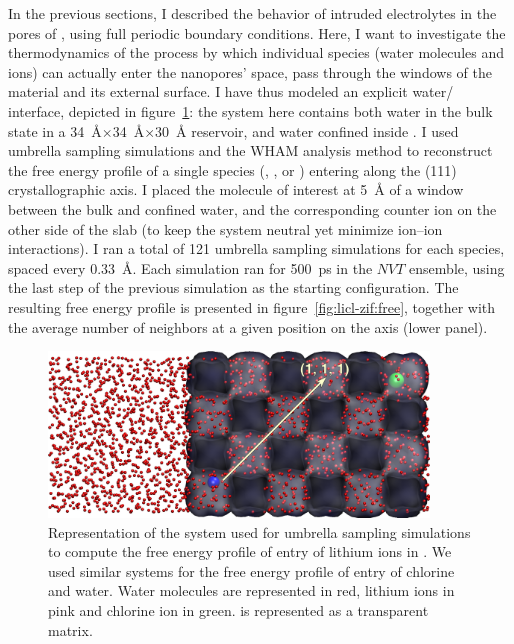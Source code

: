 \documentclass[thesis]{subfiles}
\begin{document}
In the previous sections, I described the behavior of intruded electrolytes in
the pores of , using full periodic boundary conditions. Here, I want to
investigate the thermodynamics of the process by which individual species (water
molecules and ions) can actually enter the nanopores' space, \emph{\ie} pass
through the windows of the material and its external surface. I have thus
modeled an explicit water/ interface, depicted in
figure~\ref{fig:licl-zif:umbrella-system}: the system here contains both water
in the bulk state in a \SI{34}{\AA}$\times$\SI{34}{\AA}$\times$\SI{30}{\AA}
reservoir, and water confined inside . I used umbrella sampling simulations
and the WHAM analysis method\cite{WHAM} to reconstruct the free energy profile
of a single species (, , or ) entering  along the
(111) crystallographic axis. I placed the molecule of interest at \SI{5}{\AA} of
a window between the bulk and confined water, and the corresponding counter ion
on the other side of the  slab (to keep the system neutral yet minimize
ion--ion interactions). I ran a total of 121 umbrella sampling simulations for
each species, spaced every \SI{0.33}{\AA}. Each simulation ran for \SI{500}{ps}
in the $NVT$ ensemble, using the last step of the previous simulation as the
starting configuration. The resulting free energy profile is presented in
figure~\ref{fig:licl-zif:free}, together with the average number of neighbors at
a given position on the axis (lower panel).

\begin{figure}[t]
    \centering
    \includegraphics[width=0.9\textwidth]{figures/images/licl-zif-umbrella}
    \caption{Representation of the system used for umbrella sampling simulations
    to compute the free energy profile of entry of lithium ions in . We
    used similar systems for the free energy profile of entry of chlorine and
    water. Water molecules are represented in red, lithium ions in pink and
    chlorine ion in green.  is represented as a transparent matrix.}
    \label{fig:licl-zif:umbrella-system}
\end{figure}
\end{document}
